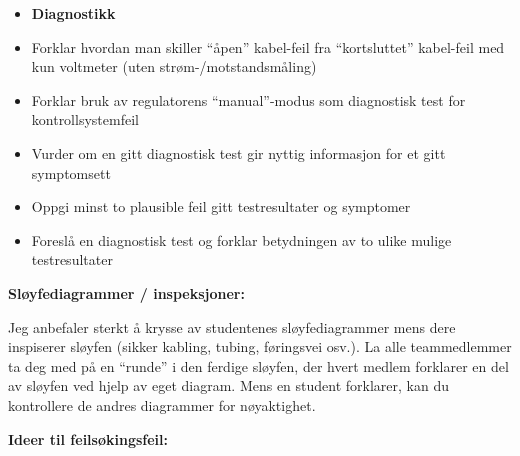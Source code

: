 \filbreak

\begin{itemize}
\item{} {\bf Diagnostikk}
\item{} Forklar hvordan man skiller ``åpen'' kabel-feil fra ``kortsluttet'' kabel-feil med kun voltmeter (uten strøm-/motstandsmåling)
\item{} Forklar bruk av regulatorens ``manual''-modus som diagnostisk test for kontrollsystemfeil
\item{} Vurder om en gitt diagnostisk test gir nyttig informasjon for et gitt symptomsett
\item{} Oppgi minst to plausible feil gitt testresultater og symptomer
\item{} Foreslå en diagnostisk test og forklar betydningen av to ulike mulige testresultater
\end{itemize}














\noindent
{\bf Sløyfediagrammer / inspeksjoner:}

Jeg anbefaler sterkt å krysse av studentenes sløyfediagrammer mens dere inspiserer sløyfen (sikker kabling, tubing, føringsvei osv.). La alle teammedlemmer ta deg med på en ``runde'' i den ferdige sløyfen, der hvert medlem forklarer en del av sløyfen ved hjelp av eget diagram. Mens en student forklarer, kan du kontrollere de andres diagrammer for nøyaktighet.

\vskip 10pt

\goodbreak

\noindent
{\bf Ideer til feilsøkingsfeil:}

